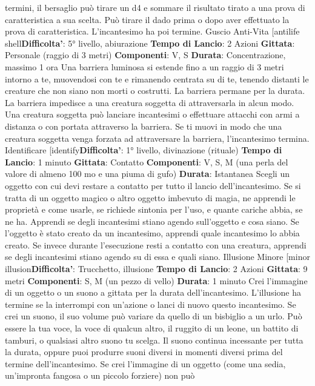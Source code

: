\begin{multicols}{2}
termini, il bersaglio può tirare un d4 e sommare il
risultato tirato a una prova di caratteristica a sua scelta.
Può tirare il dado prima o dopo aver effettuato la prova
di caratteristica. L’incantesimo ha poi termine.
Guscio Anti-Vita
[antilife shell\textbf{Difficolta'}:
5° livello, abiurazione
\textbf{Tempo di Lancio}: 2 Azioni
\textbf{Gittata}: Personale (raggio di 3 metri)
\textbf{Componenti}: V, S
\textbf{Durata}: Concentrazione, massimo 1 ora
Una barriera luminosa si estende fino a un raggio di 3
metri intorno a te, muovendosi con te e rimanendo
centrata su di te, tenendo distanti le creature che non
siano non morti o costrutti. La barriera permane per la
durata.
La barriera impedisce a una creatura soggetta di
attraversarla in alcun modo. Una creatura soggetta può
lanciare incantesimi o effettuare attacchi con armi a
distanza o con portata attraverso la barriera.
Se ti muovi in modo che una creatura soggetta venga
forzata ad attraversare la barriera, l’incantesimo
termina.
Identificare
[identify\textbf{Difficolta'}:
1° livello, divinazione (rituale)
\textbf{Tempo di Lancio}: 1 minuto
\textbf{Gittata}: Contatto
\textbf{Componenti}: V, S, M (una perla del valore di almeno
100 mo e una piuma di gufo)
\textbf{Durata}: Istantanea
Scegli un oggetto con cui devi restare a contatto per
tutto il lancio dell’incantesimo. Se si tratta di un oggetto
magico o altro oggetto imbevuto di magia, ne apprendi
le proprietà e come usarle, se richiede sintonia per
l’uso, e quante cariche abbia, se ne ha. Apprendi se
degli incantesimi stiano agendo sull’oggetto e cosa
siano. Se l’oggetto è stato creato da un incantesimo,
apprendi quale incantesimo lo abbia creato.
Se invece durante l’esecuzione resti a contatto con una
creatura, apprendi se degli incantesimi stiano agendo
su di essa e quali siano.
Illusione Minore
[minor illusion\textbf{Difficolta'}:
Trucchetto, illusione
\textbf{Tempo di Lancio}: 2 Azioni
\textbf{Gittata}: 9 metri
\textbf{Componenti}: S, M (un pezzo di vello)
\textbf{Durata}: 1 minuto
Crei l’immagine di un oggetto o un suono a gittata per la
durata dell’incantesimo. L’illusione ha termine se la
interrompi con un’azione o lanci di nuovo questo
incantesimo.
Se crei un suono, il suo volume può variare da quello di
un bisbiglio a un urlo. Può essere la tua voce, la voce di
qualcun altro, il ruggito di un leone, un battito di
tamburi, o qualsiasi altro suono tu scelga. Il suono
continua incessante per tutta la durata, oppure puoi
produrre suoni diversi in momenti diversi prima del
termine dell’incantesimo.
Se crei l’immagine di un oggetto (come una sedia,
un’impronta fangosa o un piccolo forziere) non può

\end{multicols}
